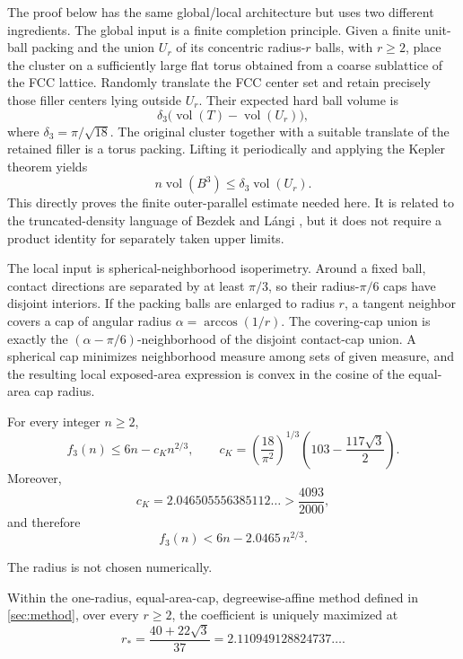 The proof below has the same global/local architecture but uses two different
ingredients.  The global input is a finite completion principle.  Given a finite
unit-ball packing and the union $U_r$ of its concentric radius-$r$ balls, with
$r\ge2$, place the cluster on a sufficiently large flat torus obtained from a
coarse sublattice of the FCC lattice.  Randomly translate the FCC center set and
retain precisely those filler centers lying outside $U_r$.  Their expected hard
ball volume is
\[
 \delta_3\bigl(\operatorname{vol}(T)-\operatorname{vol}(U_r)\bigr),
\]
where $\delta_3=\pi/\sqrt{18}$.  The original cluster together with a suitable
translate of the retained filler is a torus packing.  Lifting it periodically and
applying the Kepler theorem yields
\[
 n\operatorname{vol}(B^3)\le\delta_3\operatorname{vol}(U_r).
\]
This directly proves the finite outer-parallel estimate needed here.  It is
related to the truncated-density language of Bezdek and L\'angi
\cite{BezdekLangi2025}, but it does not require a product identity for separately
taken upper limits.

The local input is spherical-neighborhood isoperimetry.  Around a fixed ball,
contact directions are separated by at least $\pi/3$, so their radius-$\pi/6$
caps have disjoint interiors.  If the packing balls are enlarged to radius $r$,
a tangent neighbor covers a cap of angular radius $\alpha=\arccos(1/r)$.  The
covering-cap union is exactly the $(\alpha-\pi/6)$-neighborhood of the disjoint
contact-cap union.  A spherical cap minimizes neighborhood measure among sets of
given measure, and the resulting local exposed-area expression is convex in the
cosine of the equal-area cap radius.

\begin{theorem}\label{thm:main}
For every integer $n\ge2$,
\begin{equation}\label{eq:mainexact}
 f_3(n)\le6n-c_Kn^{2/3},
 \qquad
 c_K=
 \left(\frac{18}{\pi^2}\right)^{1/3}
 \left(103-\frac{117\sqrt3}{2}\right).
\end{equation}
Moreover,
\begin{equation}\label{eq:clean}
 c_K=2.046505556385112\ldots>\frac{4093}{2000},
\end{equation}
and therefore
\[
 f_3(n)<6n-2.0465\,n^{2/3}.
\]
\end{theorem}

The radius is not chosen numerically.

\begin{theorem}\label{thm:optimality}
Within the one-radius, equal-area-cap, degreewise-affine method defined in
\cref{sec:method}, over every $r\ge2$, the coefficient is uniquely maximized at
\begin{equation}\label{eq:rstar}
 r_*=
 \frac{40+22\sqrt3}{37}=2.110949128824737\ldots .
\end{equation}
\end{theorem}


